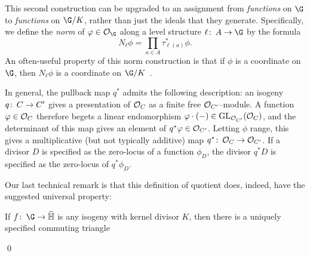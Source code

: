 \begin{definition}\label{NormForFns}
This second construction can be upgraded to an assignment from \emph{functions} on $\G$ to \emph{functions} on $\G/K$, rather than just the ideals that they generate.  Specifically, we define the \textit{norm} of $\phi \in \sheaf O_{\G}$ along a level structure $\ell\co A \to \G$ by the formula \[N_\ell \phi = \prod_{a \in A} \tau_{\ell(a)}^* \phi.\]  An often-useful property of this norm construction is that if $\phi$ is a coordinate on $\G$, then $N_\ell \phi$ is a coordinate on $\G/K$~\cite[Theorem 5.3.1]{StricklandFiniteSubgps}.
\end{definition}

\begin{remark}
In general, the pullback map $q^*$ admits the following description: an isogeny $q\colon\thinspace C \to C'$ gives a presentation of $\mathcal{O}_C$ as a finite free $\mathcal{O}_{C'}$--module.  A function $\varphi \in \mathcal{O}_C$ therefore begets a linear endomorphism $\varphi \cdot (-) \in \operatorname{GL}_{\mathcal{O}_{C'}}(\mathcal{O}_C)$, and the determinant of this map gives an element of $q^* \varphi \in \mathcal{O}_{C'}$.  Letting $\phi$ range, this gives a multiplicative (but not typically additive) map $q^*\colon\thinspace \mathcal{O}_C \to \mathcal{O}_{C'}$.  If a divisor $D$ is specified as the zero-locus of a function $\phi_D$, the divisor $q^* D$ is specified as the zero-locus of $q^* \phi_D$.
\end{remark}

Our last technical remark is that this definition of quotient does, indeed, have the suggested universal property:

\begin{lemma}
If $f\co \G \to \widehat{\mathbb H}$ is any isogeny with kernel divisor $K$, then there is a uniquely specified commuting triangle
\begin{center}
\end{center}
\qed
\end{lemma}

